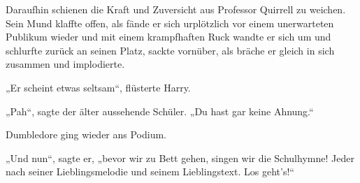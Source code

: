 Daraufhin schienen die Kraft und Zuversicht aus Professor Quirrell zu weichen. Sein Mund klaffte offen, als fände er sich urplötzlich vor einem unerwarteten Publikum wieder und mit einem krampfhaften Ruck wandte er sich um und schlurfte zurück an seinen Platz, sackte vornüber, als bräche er gleich in sich zusammen und implodierte.

„Er scheint etwas seltsam“, flüsterte Harry.

„Pah“, sagte der älter aussehende Schüler. „Du hast gar keine Ahnung.“

Dumbledore ging wieder ans Podium.

„Und nun“, sagte er, „bevor wir zu Bett gehen, singen wir die Schulhymne! Jeder nach seiner Lieblingsmelodie und seinem Lieblingstext. Los geht’s!“


